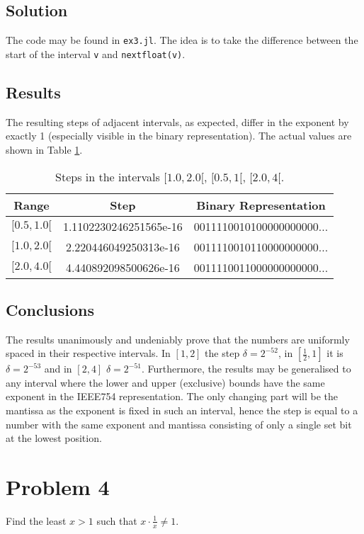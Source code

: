 \documentclass[12pt, a4paper]{article}
\newcommand{\code}[1]{\texttt{#1}}
\begin{document}
\subsection{Solution}
The code may be found in \code{ex3.jl}. The idea is to take the difference
between the start of the interval \code{v} and \code{nextfloat(v)}.

\subsection{Results}
The resulting steps of adjacent intervals, as expected, differ in the exponent
by exactly 1 (especially visible in the binary representation). The actual
values are shown in Table \ref{tab:steps}.

\begin{table}[h]
\centering
\begin{tabular}{@{}ccc@{}}
\toprule
Range        & Step                   & Binary Representation     \\ \midrule
$[0.5, 1.0[$ & 1.1102230246251565e-16 & 0011110010100000000000... \\ \midrule
$[1.0, 2.0[$ & 2.220446049250313e-16  & 0011110010110000000000... \\ \midrule
$[2.0, 4.0[$ & 4.440892098500626e-16  & 0011110011000000000000... \\ \bottomrule
\end{tabular}
\caption{Steps in the intervals $[1.0, 2.0[$, $[0.5, 1[$, $[2.0, 4[$.}
\label{tab:steps}
\end{table}

\subsection{Conclusions}
The results unanimously and undeniably prove that the numbers are uniformly
spaced in their respective intervals. In $[1, 2]$ the step $\delta = 2^{-52}$,
in $[\frac{1}{2}, 1]$ it is $\delta = 2^{-53}$ and in $[2, 4]$ $\delta =
2^{-51}$. Furthermore, the results may be generalised to any interval where the
lower and upper (exclusive) bounds have the same exponent in the IEEE754
representation. The only changing part will be the mantissa as the exponent is
fixed in such an interval, hence the step is equal to a number with the same
exponent and mantissa consisting of only a single set bit at the lowest
position.

\section{Problem 4}
Find the least $x > 1$ such that $x \cdot \frac{1}{x} \neq 1$.
\end{document}
